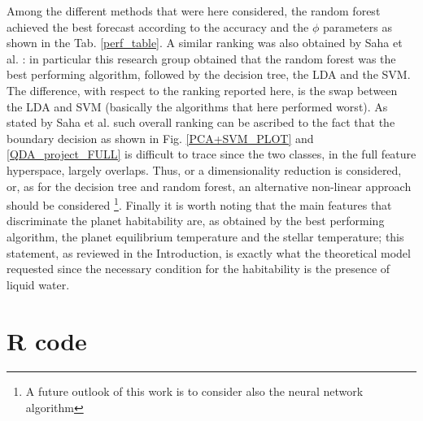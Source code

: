 \documentclass[
12pt, %
a4paper, %
oneside, %
headinclude,footinclude, %
BCOR5mm, %
]{scrartcl}
\begin{document}
Among the different methods that were here considered, the random forest achieved the best forecast according to the accuracy and the $\phi$ parameters as shown in the Tab. \ref{perf_table}. A similar ranking was also obtained by Saha et al. \cite{saha2018machine}: in particular this research group obtained that the random forest was the best performing algorithm, followed by the decision tree, the LDA and the SVM. The difference, with respect to the ranking reported here, is the swap between the LDA and SVM (basically the algorithms that here performed worst). As stated by Saha et al. \cite{saha2018machine} such overall ranking can be ascribed to the fact that the boundary decision as shown in Fig. \ref{PCA+SVM_PLOT} and  \ref{QDA_project_FULL} is difficult to trace since the two classes, in the full feature hyperspace, largely overlaps. Thus, or a dimensionality reduction is considered, or, as for the decision tree and random forest, an alternative non-linear approach should be considered \footnote{A future outlook of this work is to consider also the neural network algorithm}. Finally it is worth noting that the main features that discriminate the planet habitability are, as obtained by the best performing algorithm, the planet equilibrium temperature and the stellar temperature; this statement, as reviewed in the Introduction, is exactly what the theoretical model requested since the necessary condition for the habitability is the presence of liquid water. 




\section{R code}







\renewcommand{\refname}{\spacedlowsmallcaps{References}} %




\end{document}

